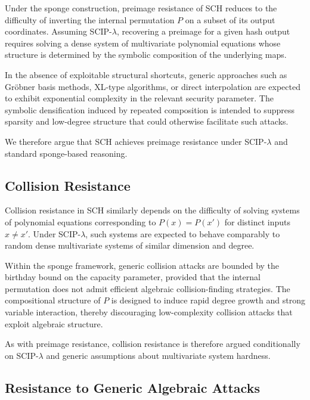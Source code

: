 ﻿\documentclass[english]{aucmcs}
\begin{document}
Under the sponge construction, preimage resistance of SCH reduces to the difficulty of inverting the internal permutation $P$ on a subset of its output coordinates. Assuming SCIP-$\lambda$, recovering a preimage for a given hash output requires solving a dense system of multivariate polynomial equations whose structure is determined by the symbolic composition of the underlying maps.

In the absence of exploitable structural shortcuts, generic approaches such as Gr\"obner basis methods, XL-type algorithms, or direct interpolation are expected to exhibit exponential complexity in the relevant security parameter. The symbolic densification induced by repeated composition is intended to suppress sparsity and low-degree structure that could otherwise facilitate such attacks.

We therefore argue that SCH achieves preimage resistance under SCIP-$\lambda$ and standard sponge-based reasoning.



\subsection{Collision Resistance}

Collision resistance in SCH similarly depends on the difficulty of solving systems of polynomial equations corresponding to $P(x) = P(x')$ for distinct inputs $x \neq x'$. Under SCIP-$\lambda$, such systems are expected to behave comparably to random dense multivariate systems of similar dimension and degree.

Within the sponge framework, generic collision attacks are bounded by the birthday bound on the capacity parameter, provided that the internal permutation does not admit efficient algebraic collision-finding strategies. The compositional structure of $P$ is designed to induce rapid degree growth and strong variable interaction, thereby discouraging low-complexity collision attacks that exploit algebraic structure.

As with preimage resistance, collision resistance is therefore argued conditionally on SCIP-$\lambda$ and generic assumptions about multivariate system hardness.



\subsection{Resistance to Generic Algebraic Attacks}
\end{document}
